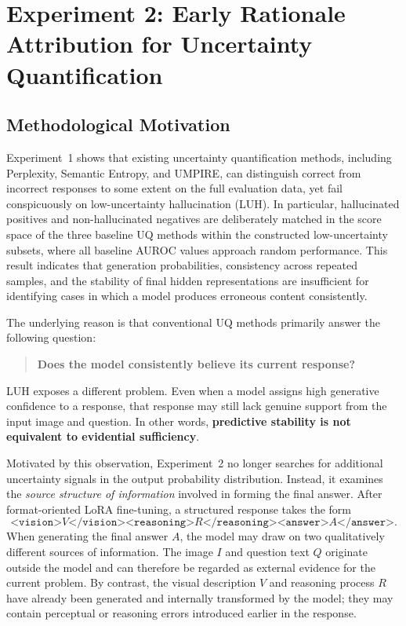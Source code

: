 \clearpage
\section{Experiment 2: Early Rationale Attribution for Uncertainty Quantification}
\label{sec:era_method}

\subsection{Methodological Motivation}
\label{subsec:era_motivation}

Experiment~1 shows that existing uncertainty quantification methods, including Perplexity, Semantic Entropy, and UMPIRE, can distinguish correct from incorrect responses to some extent on the full evaluation data, yet fail conspicuously on low-uncertainty hallucination (LUH). In particular, hallucinated positives and non-hallucinated negatives are deliberately matched in the score space of the three baseline UQ methods within the constructed low-uncertainty subsets, where all baseline AUROC values approach random performance. This result indicates that generation probabilities, consistency across repeated samples, and the stability of final hidden representations are insufficient for identifying cases in which a model produces erroneous content consistently.

The underlying reason is that conventional UQ methods primarily answer the following question:

\begin{quote}
\centering
\textbf{Does the model consistently believe its current response?}
\end{quote}

LUH exposes a different problem. Even when a model assigns high generative confidence to a response, that response may still lack genuine support from the input image and question. In other words, \textbf{predictive stability is not equivalent to evidential sufficiency}.

Motivated by this observation, Experiment~2 no longer searches for additional uncertainty signals in the output probability distribution. Instead, it examines the \emph{source structure of information} involved in forming the final answer. After format-oriented LoRA fine-tuning, a structured response takes the form
\[
\texttt{<vision>}V\texttt{</vision>}
\texttt{<reasoning>}R\texttt{</reasoning>}
\texttt{<answer>}A\texttt{</answer>}.
\]
When generating the final answer $A$, the model may draw on two qualitatively different sources of information. The image $I$ and question text $Q$ originate outside the model and can therefore be regarded as external evidence for the current problem. By contrast, the visual description $V$ and reasoning process $R$ have already been generated and internally transformed by the model; they may contain perceptual or reasoning errors introduced earlier in the response.

